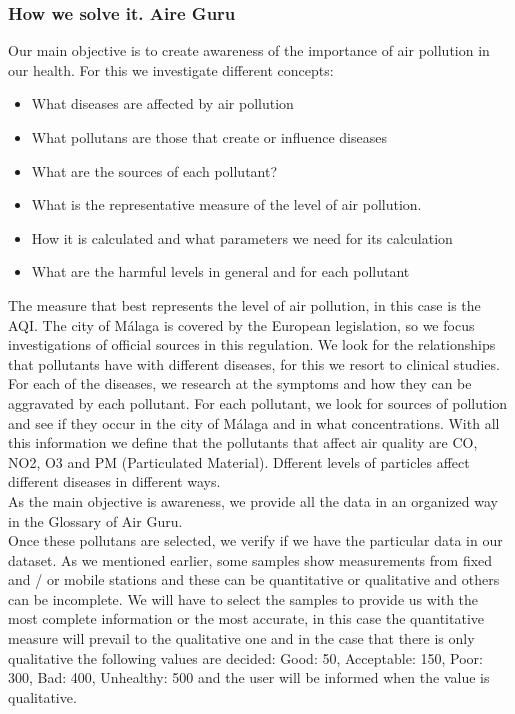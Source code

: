 \subsubsection*{How we solve it. Aire Guru} 
Our main objective is to create awareness of the importance of air pollution in our health. For this we investigate different concepts:
\begin{itemize}
    \item What diseases are affected by air pollution
    \item What pollutans are those that create or influence diseases
    \item What are the sources of each pollutant?
    \item What is the representative measure of the level of air pollution.
    \item How it is calculated and what parameters we need for its calculation
    \item What are the harmful levels in general and for each pollutant
\end{itemize}
The measure that best represents the level of air pollution, in this case is the AQI. The city of Málaga is covered by the European legislation, 
so we focus investigations of official sources in this regulation.
We look for the relationships that pollutants have with different diseases, for this we resort to clinical studies. For each of the diseases, we 
research at the symptoms and how they can be aggravated by each pollutant.
For each pollutant, we look for sources of pollution and see if they occur in the city of Málaga and in what concentrations.
With all this information we define that the pollutants that affect air quality are CO, NO2, O3 and PM (Particulated Material). Dfferent levels of particles
affect different diseases in different ways. \\

As the main objective is awareness, we provide all the data in an organized way in the Glossary of Air Guru. \\

Once these pollutans are selected, we verify if we have the particular data in our dataset. As we mentioned earlier, some samples show measurements 
from fixed and / or mobile stations and these can be quantitative or qualitative and others can be incomplete. We will have to select the
samples to provide us with the most complete information or the most accurate, in this case the quantitative measure will prevail to the qualitative 
one and in the case that there is only qualitative
the following values are decided: Good: 50, Acceptable: 150, Poor: 300, Bad: 400, Unhealthy: 500 and the user will be informed when the value is qualitative. \\


